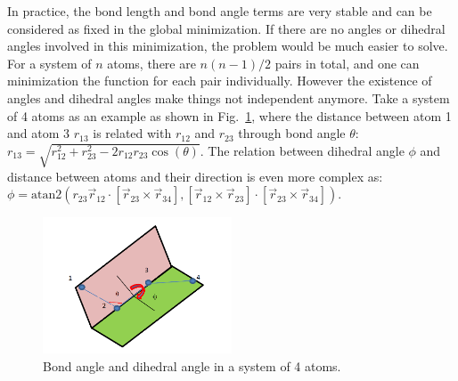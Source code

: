 \documentclass{article} %
\begin{document}
\pagebreak

In practice, the bond length and bond angle terms are very stable and can be considered as fixed in the global
minimization. If there are no angles or dihedral angles involved in this minimization, the problem would be much easier to solve.
For a system of $n$ atoms, there are $n(n-1)/2$ pairs in total, and one can minimization the function for each pair individually.
However the existence of angles and dihedral angles make things not independent anymore. Take a system of 4 atoms as an example as 
shown in Fig.~\ref{fig:3d}, where the distance between atom 1 and atom 3 $r_{13}$ is related with $r_{12} $ and $r_{23}$ through 
bond angle $\theta$: $r_{13}=\sqrt{r^2_{12}+r^2_{23}-2r_{12}r_{23}\cos(\theta)}$. The relation between dihedral angle $\phi$ and 
distance between atoms and their direction is even more complex as: 
$\phi=\mbox{atan2}( r_{23}\vec{r}_{12}\cdot[\vec{r}_{23}\times\vec{r}_{34}], [\vec{r}_{12}\times\vec{r}_{23}]\cdot [\vec{r}_{23}\times\vec{r}_{34}] )$.



\begin{figure} 
\begin{center} 
\includegraphics[width=0.5\textwidth]{3dangle.png}
\end{center}  
\caption{Bond angle and dihedral angle in a system of 4 atoms. }
\label{fig:3d}
\end{figure} 
\end{document}
